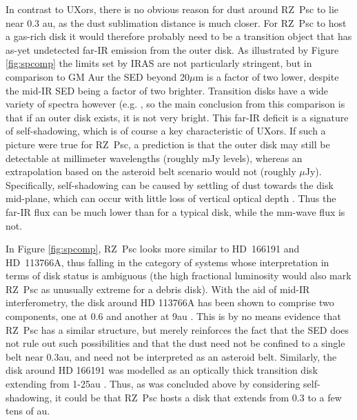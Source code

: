 \documentclass[]{rsos}
\begin{document}
In contrast to UXors, there is no obvious reason for dust around RZ~Psc to lie near 0.3
au, as the dust sublimation distance is much closer. For RZ~Psc to host a gas-rich disk
it would therefore probably need to be a transition object that has as-yet undetected
far-IR emission from the outer disk. As illustrated by Figure \ref{fig:spcomp} the limits
set by IRAS are not particularly stringent, but in comparison to GM Aur the SED beyond
20$\mu$m is a factor of two lower, despite the mid-IR SED being a factor of two
brighter. Transition disks have a wide variety of spectra however
(e.g. \cite{2011ApJ...728...49E,2014MNRAS.443.1587R}, so the main conclusion from this
comparison is that if an outer disk exists, it is not very bright. This far-IR deficit is
a signature of self-shadowing, which is of course a key characteristic of UXors. If such
a picture were true for RZ~Psc, a prediction is that the outer disk may still be
detectable at millimeter wavelengths (roughly mJy levels), whereas an extrapolation based
on the asteroid belt scenario would not (roughly $\mu$Jy). Specifically, self-shadowing
can be caused by settling of dust towards the disk mid-plane, which can occur with little
loss of vertical optical depth \cite{2004A&A...421.1075D}. Thus the far-IR flux can be
much lower than for a typical disk, while the mm-wave flux is not.

In Figure \ref{fig:spcomp}, RZ~Psc looks more similar to HD~166191 and HD~113766A, thus
falling in the category of systems whose interpretation in terms of disk status is
ambiguous (the high fractional luminosity would also mark RZ~Psc as unusually extreme for
a debris disk). With the aid of mid-IR interferometry, the disk around HD 113766A has
been shown to comprise two components, one at 0.6 and another at 9au
\cite{2013A&A...551A.134O}. This is by no means evidence that RZ~Psc has a similar
structure, but merely reinforces the fact that the SED does not rule out such
possibilities and that the dust need not be confined to a single belt near 0.3au, and
need not be interpreted as an asteroid belt. Similarly, the disk around HD 166191 was
modelled as an optically thick transition disk extending from 1-25au
\cite{2014MNRAS.438.3299K}. Thus, as was concluded above by considering self-shadowing,
it could be that RZ~Psc hosts a disk that extends from 0.3 to a few tens of au.
\end{document}
